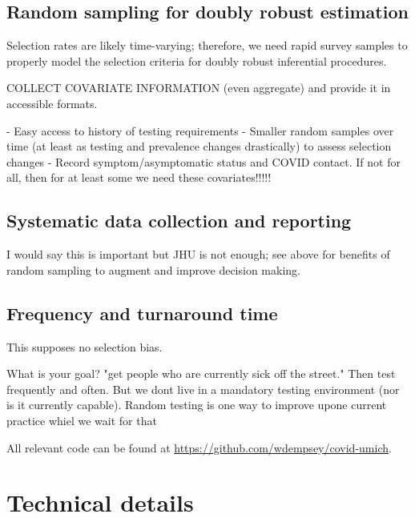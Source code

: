 \documentclass[11pt]{amsart}
\begin{document}
\subsection*{Random sampling for doubly robust estimation}

Selection rates are likely time-varying; therefore, we need rapid survey samples to properly model the selection criteria for doubly robust inferential procedures.

COLLECT COVARIATE INFORMATION (even aggregate) and provide it in accessible formats.

- Easy access to history of testing requirements
- Smaller random samples over time (at least as testing and prevalence changes drastically) to assess selection changes
- Record symptom/asymptomatic status and COVID contact.  If not for all, then for at least some we need these covariates!!!!!

\subsection*{Systematic data collection and reporting}

I would say this is important but JHU is not enough; see above for benefits of random sampling to augment and improve decision making.

\subsection*{Frequency and turnaround time}

This supposes no selection bias.




What is your goal?  "get people who are currently sick off the street." Then test frequently and often.  But we dont live in a mandatory testing environment (nor is it currently capable).  Random testing is one way to improve upone current practice whiel we wait for that




\appendix

All relevant code can be found at \url{https://github.com/wdempsey/covid-umich}.

\section{Technical details}
\end{document}
